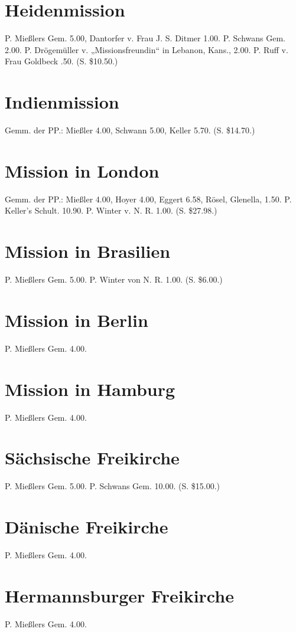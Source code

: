 \section{Heidenmission}
P. Mießlers Gem. 5.00, Dantorfer v. Frau J. S. Ditmer 1.00. P. Schwans Gem. 2.00. P. Drögemüller v. „Missionsfreundin“ in Lebanon, Kans., 2.00. P. Ruff v. Frau Goldbeck .50. (S. \$10.50.)

\section{Indienmission}
Gemm. der PP.: Mießler 4.00, Schwann 5.00, Keller 5.70. (S. \$14.70.)

\section{Mission in London}
Gemm. der PP.: Mießler 4.00, Hoyer 4.00, Eggert 6.58, Rösel, Glenella, 1.50. P. Keller’s Schult. 10.90. P. Winter v. N. R. 1.00. (S. \$27.98.)

\section{Mission in Brasilien}
P. Mießlers Gem. 5.00. P. Winter von N. R. 1.00. (S. \$6.00.)

\section{Mission in Berlin}
P. Mießlers Gem. 4.00.

\section{Mission in Hamburg}
P. Mießlers Gem. 4.00.

\section{Sächsische Freikirche}
P. Mießlers Gem. 5.00. P. Schwans Gem. 10.00. (S. \$15.00.)

\section{Dänische Freikirche}
P. Mießlers Gem. 4.00.

\section{Hermannsburger Freikirche}
P. Mießlers Gem. 4.00.

